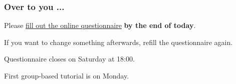\begin{frame}\frametitle{Over to you ...}
	Please \href{https://docs.google.com/spreadsheet/viewform?formkey=dERqREtHZUxVMkRuT2s4bnlzeTdXY2c6MA}{fill out the online questionnaire} \textbf{by the end of today}.

	\vspace{12pt}
	If you want to change something afterwards, refill the questionnaire again.

	\vspace{12pt}
	Questionnaire closes on Saturday at 18:00.

	\vspace{12pt}
	First group-based tutorial is on Monday.
\end{frame}
